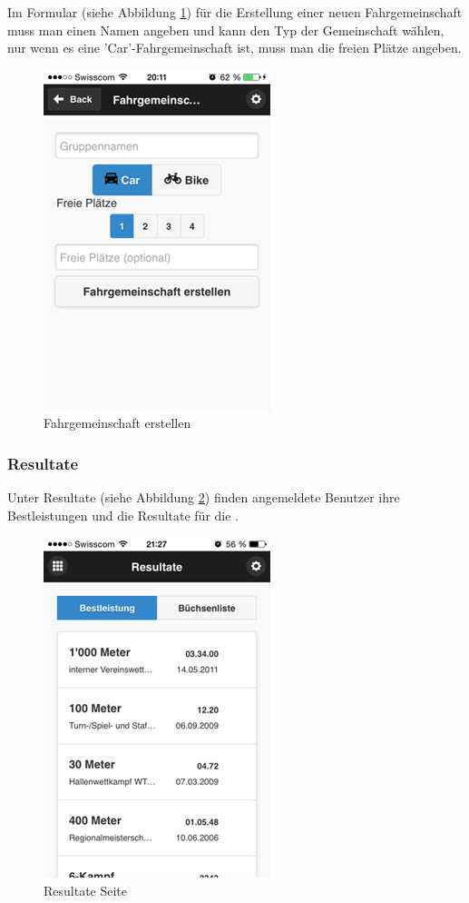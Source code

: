 Im Formular (siehe Abbildung \ref{fig:app_add_carpool}) für die Erstellung einer neuen Fahrgemeinschaft muss man einen Namen angeben und kann den Typ der Gemeinschaft wählen, nur wenn es eine 'Car'-Fahrgemeinschaft ist, muss man die freien Plätze angeben.

\begin{figure}[h]
\centering
\includegraphics[scale=0.5]{images/app/add_carpool.png}
\caption{Fahrgemeinschaft erstellen}
\label{fig:app_add_carpool}
\end{figure}


\newpage
\FloatBarrier
\subsubsection{Resultate}
Unter Resultate (siehe Abbildung \ref{fig:app_results}) finden angemeldete Benutzer ihre Bestleistungen und die Resultate für die .
\begin{figure}[h]
\centering
\includegraphics[scale=0.5]{images/app/results.png}
\caption{Resultate Seite}
\label{fig:app_results}
\end{figure}


